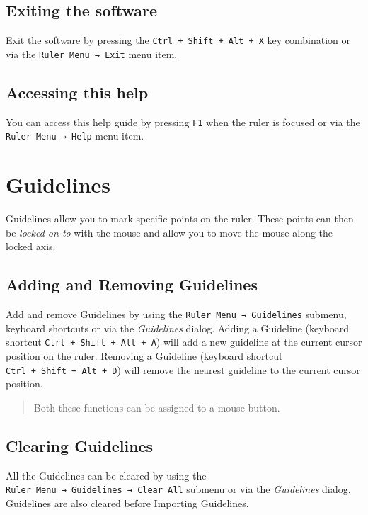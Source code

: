 \documentclass[
]{book}
\begin{document}
\section{Exiting the software}\label{exiting-the-software}

Exit the software by pressing the \texttt{Ctrl\ +\ Shift\ +\ Alt\ +\ X} key combination or via the \texttt{Ruler\ Menu\ →\ Exit} menu item.

\section{Accessing this help}\label{accessing-this-help}

You can access this help guide by pressing \texttt{F1} when the ruler is focused or via the \texttt{Ruler\ Menu\ →\ Help} menu item.

\chapter{Guidelines}\label{guidelines}

Guidelines allow you to mark specific points on the ruler.
These points can then be \emph{locked on to} with the mouse and allow you to move the mouse along the locked axis.

\section{Adding and Removing Guidelines}\label{adding-and-removing-guidelines}

Add and remove Guidelines by using the \texttt{Ruler\ Menu\ →\ Guidelines} submenu, keyboard shortcuts or via the \emph{Guidelines} dialog.
Adding a Guideline (keyboard shortcut \texttt{Ctrl\ +\ Shift\ +\ Alt\ +\ A}) will add a new guideline at the current cursor position on the ruler.
Removing a Guideline (keyboard shortcut \texttt{Ctrl\ +\ Shift\ +\ Alt\ +\ D}) will remove the nearest guideline to the current cursor position.

\begin{quote}
Both these functions can be assigned to a mouse button.
\end{quote}

\section{Clearing Guidelines}\label{clearing-guidelines}

All the Guidelines can be cleared by using the \texttt{Ruler\ Menu\ →\ Guidelines\ →\ Clear\ All} submenu or via the \emph{Guidelines} dialog.
Guidelines are also cleared before Importing Guidelines.
\end{document}
